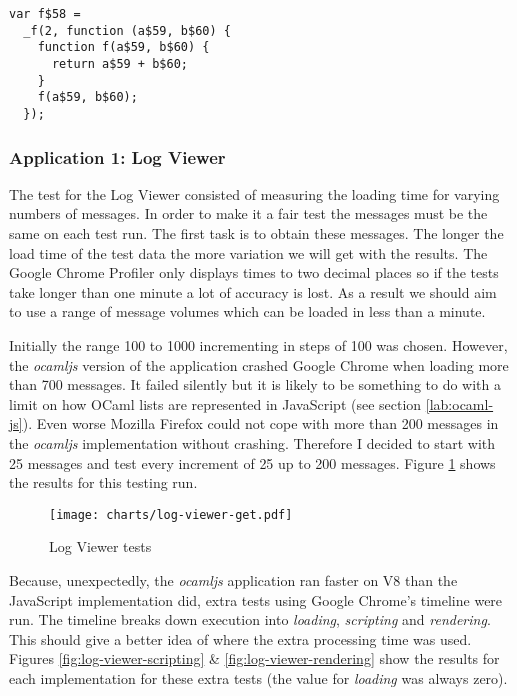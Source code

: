 \begin{lstlisting}[caption={Example with named function}]
var f$58 =
  _f(2, function (a$59, b$60) {
    function f(a$59, b$60) {
      return a$59 + b$60;
    }
    f(a$59, b$60);
  });
\end{lstlisting}

\subsubsection{Application 1: Log Viewer}
The test for the Log Viewer consisted of measuring the loading time for varying numbers of messages. In order to make it a fair test the messages must be the same on each test run. The first task is to obtain these messages. The longer the load time of the test data the more variation we will get with the results. The Google Chrome Profiler only displays times to two decimal places so if the tests take longer than one minute a lot of accuracy is lost. As a result we should aim to use a range of message volumes which can be loaded in less than a minute.

Initially the range 100 to 1000 incrementing in steps of 100 was chosen. However, the \emph{ocamljs} version of the application crashed Google Chrome when loading more than 700 messages. It failed silently but it is likely to be something to do with a limit on how OCaml lists are represented in JavaScript (see section \ref{lab:ocaml-js}). Even worse Mozilla Firefox could not cope with more than 200 messages in the \emph{ocamljs} implementation without crashing. Therefore I decided to start with 25 messages and test every increment of 25 up to 200 messages. Figure \ref{fig:log-viewer-test} shows the results for this testing run.

\begin{figure}
  \texttt{[image: charts/log-viewer-get.pdf]}
  \caption{Log Viewer tests}
  \label{fig:log-viewer-test}
\end{figure}

Because, unexpectedly, the \emph{ocamljs} application ran faster on V8 than the JavaScript implementation did, extra tests using Google Chrome's timeline were run. The timeline breaks down execution into \emph{loading}, \emph{scripting} and \emph{rendering}. This should give a better idea of where the extra processing time was used. Figures \ref{fig:log-viewer-scripting} \& \ref{fig:log-viewer-rendering} show the results for each implementation for these extra tests (the value for \emph{loading} was always zero).


